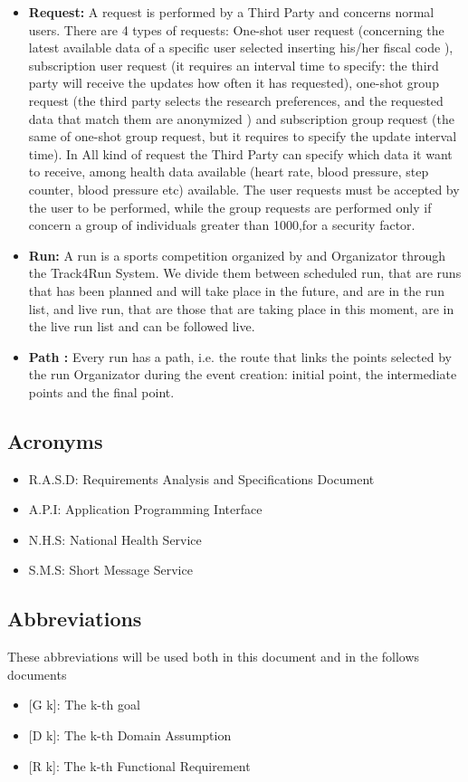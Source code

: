 \begin{itemize}
\item\textbf{Request:} A request is performed by a Third Party and concerns normal users. There are 4 types of requests: One-shot user request (concerning the latest available data of a specific user selected inserting his/her fiscal code ), subscription user request (it requires an interval time to specify: the third party will receive the updates how often it has requested), one-shot group request (the third party selects the research preferences, and the requested data that match them are anonymized ) and subscription group request (the same of one-shot group request, but it requires to specify the update interval time). In All kind of request the Third Party can specify which data it want to receive, among health data available (heart rate, blood pressure, step counter, blood pressure etc) available. The user requests must be accepted by the user to be performed, while the group requests are performed only if concern a group of individuals greater than 1000,for a security factor.

\item\textbf{Run:} A run is a sports competition organized by and Organizator through  the Track4Run System. We divide them between scheduled run, that are runs that has been planned and will take place in the future, and are in the run list, and live run, that are those that are taking place in this moment, are in the live run list and can be followed live. 
\item\textbf{Path :} Every run has a path, i.e. the route that links the points selected by the run Organizator during the event creation: initial point, the intermediate points and the final point. 

	\end{itemize}
\subsection{Acronyms}

\begin{itemize}
  \item R.A.S.D: Requirements Analysis and Specifications Document
  \item A.P.I: Application Programming Interface 
  \item N.H.S: National Health Service
  \item S.M.S: Short Message Service
\end{itemize}

\subsection{Abbreviations}
These abbreviations will be used both in this document and in the follows documents
\begin{itemize}
	\item {[}G k{]}: The k-th goal
    \item {[}D k{]}: The k-th Domain Assumption
    \item {[}R k{]}: The k-th Functional Requirement
\end{itemize}
